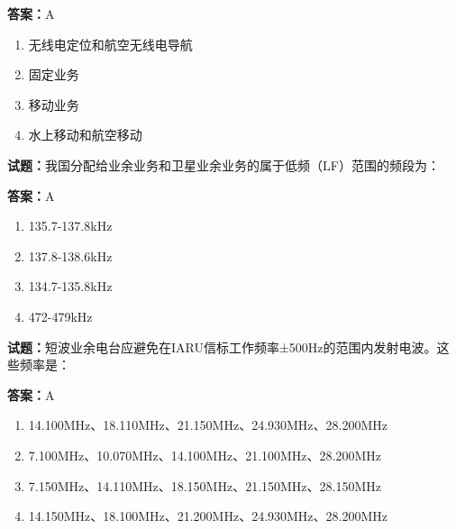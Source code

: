 \documentclass{ctexbook}
\begin{document}
\textbf{答案：}A 

\begin{enumerate}[leftmargin=3em]
  \item 无线电定位和航空无线电导航 

  \item 固定业务 

  \item 移动业务 

  \item 水上移动和航空移动 

\end{enumerate}





\vspace{1em}

\textbf{试题：}我国分配给业余业务和卫星业余业务的属于低频（LF）范围的频段为： 

\textbf{答案：}A 

\begin{enumerate}[leftmargin=3em]
  \item 135.7-137.8kHz 

  \item 137.8-138.6kHz 

  \item 134.7-135.8kHz 

  \item 472-479kHz 

\end{enumerate}





\vspace{1em}

\textbf{试题：}短波业余电台应避免在IARU信标工作频率±500Hz的范围内发射电波。这些频率是： 

\textbf{答案：}A 

\begin{enumerate}[leftmargin=3em]
  \item 14.100MHz、18.110MHz、21.150MHz、24.930MHz、28.200MHz 

  \item 7.100MHz、10.070MHz、14.100MHz、21.100MHz、28.200MHz 

  \item 7.150MHz、14.110MHz、18.150MHz、21.150MHz、28.150MHz 


  \item 14.150MHz、18.100MHz、21.200MHz、24.930MHz、28.200MHz 

\end{enumerate}
\end{document}
